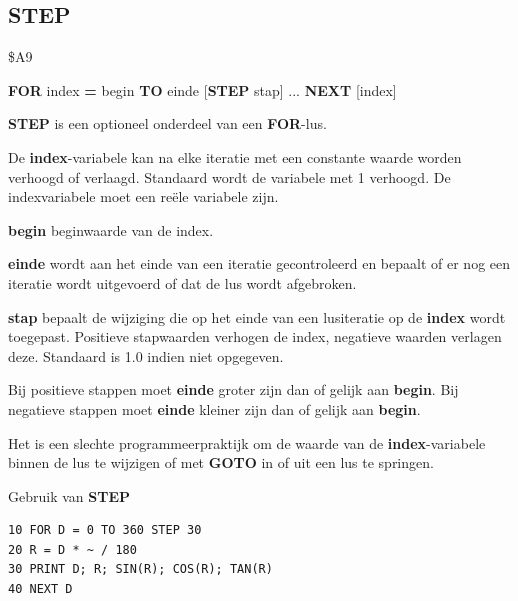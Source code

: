 \subsection{STEP}
\begin{description}[leftmargin=2cm,style=nextline]
\item [Token:]    \$A9

\item [Formaat:]   {\bf FOR} index {\bf =} begin {\bf TO} einde [{\bf STEP} stap] ... {\bf NEXT} [index]

\item [Gebruik:]    {\bf STEP} is een optioneel onderdeel van een {\bf FOR}-lus.

                  De {\bf index}-variabele kan na elke iteratie met een constante waarde worden verhoogd of verlaagd. Standaard wordt de variabele met 1 verhoogd. De indexvariabele moet een reële variabele zijn.

{\bf begin} beginwaarde van de index.

{\bf einde} wordt aan het einde van een iteratie gecontroleerd en bepaalt of er nog een iteratie wordt uitgevoerd of dat de lus wordt afgebroken.

{\bf stap} bepaalt de wijziging die op het einde van een lusiteratie op de {\bf index} wordt toegepast. Positieve stapwaarden verhogen de index, negatieve waarden verlagen deze. Standaard is 1.0 indien niet opgegeven.

\item [Opmerkingen:]  Bij positieve stappen moet {\bf einde} groter zijn dan of gelijk aan {\bf begin}. Bij negatieve stappen moet {\bf einde} kleiner zijn dan of gelijk aan {\bf begin}.

                  Het is een slechte programmeerpraktijk om de waarde van de {\bf index}-variabele binnen de lus te wijzigen of met {\bf GOTO} in of uit een lus te springen.

\item [Voorbeeld:]  Gebruik van {\bf STEP}

\begin{tcolorbox}[colback=black,coltext=white]
\verbatimfont{\codefont}
\begin{verbatim}
10 FOR D = 0 TO 360 STEP 30
20 R = D * ~ / 180
30 PRINT D; R; SIN(R); COS(R); TAN(R)
40 NEXT D
\end{verbatim}
\end{tcolorbox}
\end{description}

